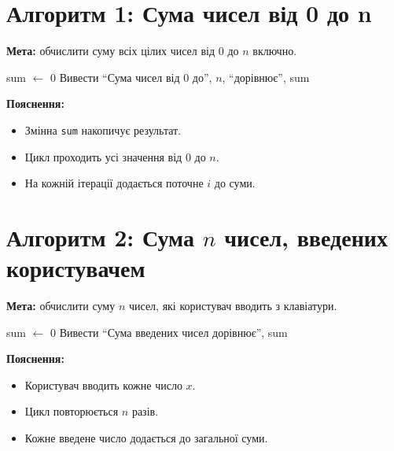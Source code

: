 \documentclass{scrreprt} %
\begin{document}
	\maketitle
	
	\section*{Алгоритм 1: Сума чисел від 0 до n}
	\textbf{Мета:} обчислити суму всіх цілих чисел від 0 до $n$ включно.
	\begin{tcolorbox}[colback=blue!10!white, colframe=blue!50!black, arc=2mm]
	\begin{algorithm}[H]
		\SetAlgoLined
		sum $\leftarrow$ 0\;
		Вивести ``Сума чисел від 0 до'', $n$, ``дорівнює'', sum\;
		\caption{Сума\_від\_0\_до\_n}
	\end{algorithm}
	\end{tcolorbox}
	
	\textbf{Пояснення:}
	\begin{itemize}
		\item Змінна \texttt{sum} накопичує результат.
		\item Цикл проходить усі значення від 0 до $n$.
		\item На кожній ітерації додається поточне $i$ до суми.
	\end{itemize}
	
	\vspace{1em}
	
	\section*{Алгоритм 2: Сума $n$ чисел, введених користувачем}
	\textbf{Мета:} обчислити суму $n$ чисел, які користувач вводить з клавіатури.
	
	\begin{tcolorbox}[colback=blue!10!white, colframe=blue!50!black, arc=2mm]
	\begin{algorithm}[H]
		\SetAlgoLined
		sum $\leftarrow$ 0\;
		Вивести ``Сума введених чисел дорівнює'', sum\;
		\caption{Сума\_n\_введених\_чисел}
	\end{algorithm}
\end{tcolorbox}
	
	\textbf{Пояснення:}
	\begin{itemize}
		\item Користувач вводить кожне число $x$.
		\item Цикл повторюється $n$ разів.
		\item Кожне введене число додається до загальної суми.
	\end{itemize}
	
\end{document}

